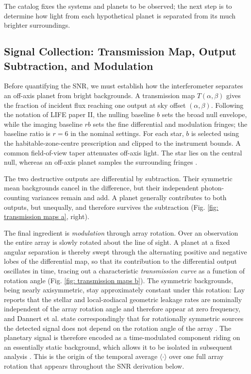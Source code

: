 \documentclass[12pt,a4paper]{article}
\numberwithin{equation}{section}
\numberwithin{figure}{section}
\numberwithin{table}{section}
\begin{document}
The catalog fixes the systems and planets to be observed; the next step is to determine how light from each hypothetical planet is separated from its much brighter surroundings.

\subsection{Signal Collection: Transmission Map, Output Subtraction, and Modulation} \label{sec: intro: signal collection}
Before quantifying the SNR, we must establish how the interferometer separates an off-axis planet from bright backgrounds. A transmission map $T(\alpha,\beta)$ gives the fraction of incident flux reaching one output at sky offset $(\alpha,\beta)$. Following the notation of LIFE paper II, the nulling baseline $b$ sets the broad null envelope, while the imaging baseline $rb$ sets the fine differential and modulation fringes; the baseline ratio is $r=6$ in the nominal settings. For each star, $b$ is selected using the habitable-zone-centre prescription and clipped to the instrument bounds. A common field-of-view taper attenuates off-axis light. The star lies on the central null, whereas an off-axis planet samples the surrounding fringes \cite{dannert2022life2}.

The two destructive outputs are differential by subtraction. Their symmetric mean backgrounds cancel in the difference, but their independent photon-counting variances remain and add. A planet generally contributes to both outputs, but unequally, and therefore survives the subtraction (Fig. \ref{fig: transmission maps a}, right).

The final ingredient is \textit{modulation} through array rotation. Over an observation the entire array is slowly rotated about the line of sight. A planet at a fixed angular separation is thereby swept through the alternating positive and negative lobes of the differential map, so that its contribution to the differential output oscillates in time, tracing out a characteristic \textit{transmission curve} as a function of rotation angle (Fig. \ref{fig: transmission maps b}). The symmetric backgrounds, being nearly axisymmetric, stay approximately constant under this rotation: Lay reports that the stellar and local-zodiacal geometric leakage rates are nominally independent of the array rotation angle and therefore appear at zero frequency, and Dannert et al. state correspondingly that for rotationally symmetric sources the detected signal does not depend on the rotation angle of the array \cite{lay2004systematic,dannert2022life2}. The planetary signal is therefore encoded as a time-modulated component riding on an essentially static background, which allows it to be isolated in subsequent analysis \cite{lay2005imaging,dannert2022life2}. This is the origin of the temporal average $\langle\cdot\rangle$ over one full array rotation that appears throughout the SNR derivation below.
\end{document}
